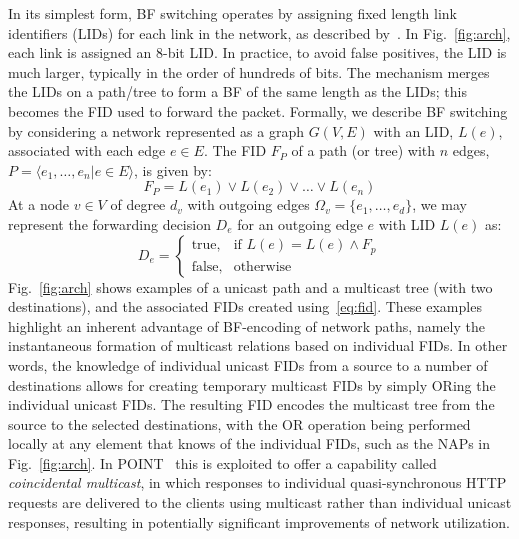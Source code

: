 \documentclass[conference]{IEEEtran}
\newcommand{\figref}[1]{Fig.~\ref{#1}}
\begin{document}
In its simplest form, BF switching operates by assigning fixed length link identifiers (LIDs) for each link in the network, as described by~\cite{Jokela09}.  In \figref{fig:arch}, each link is assigned an 8-bit LID. In practice, to avoid false positives, the LID is much larger, typically in the order of hundreds of bits. The mechanism merges the LIDs on a path/tree to form a BF of the same length as the LIDs; this becomes the FID used to forward the packet.  Formally, we describe BF switching by considering a network represented as a graph $G(V,E)$ with an LID, $L(e)$, associated with each edge $e\in E$. The FID $F_P$ of a path (or tree) with $n$ edges, $P=\langle e_1, \ldots, e_n | e \in E \rangle$, is given by: 
\begin{equation} 
\label{eq:fid}
F_P = L(e_1) \vee L(e_2) \vee \ldots \vee L(e_n)
\end{equation}
At a node $v \in V$ of degree $d_v$ with outgoing edges $\Omega_v=\{e_1,\ldots,e_d\}$, we may represent the forwarding decision $D_e$ for an outgoing edge $e$ with LID $L(e)$ as: \begin{equation}
  \label{eq:bf-match}
  D_e= \left\{
  \begin{array}{ll}
    \text{true}, & \text{if } L(e) = L(e) \wedge F_p \\
    \text{false}, & \text{otherwise}
  \end{array} 
\right.
\end{equation}
\figref{fig:arch} shows examples of a unicast path and a multicast tree (with two destinations), and the associated FIDs created using~\eqref{eq:fid}. These examples highlight an inherent advantage of BF-encoding of network paths, namely the instantaneous formation of multicast relations based on individual FIDs. In other words, the knowledge of individual unicast FIDs from a source to a number of destinations allows for creating temporary multicast FIDs by simply ORing the individual unicast FIDs. The resulting FID encodes the multicast tree from the source to the selected destinations, with the OR operation being performed locally at any element that knows of the individual FIDs, such as the NAPs in \figref{fig:arch}. In POINT~\cite{Trossen2015} this is exploited to offer a capability called \emph{coincidental multicast}, in which responses to individual quasi-synchronous HTTP requests are delivered to the clients using multicast rather than individual unicast responses, resulting in potentially significant improvements of network utilization.
\end{document}
